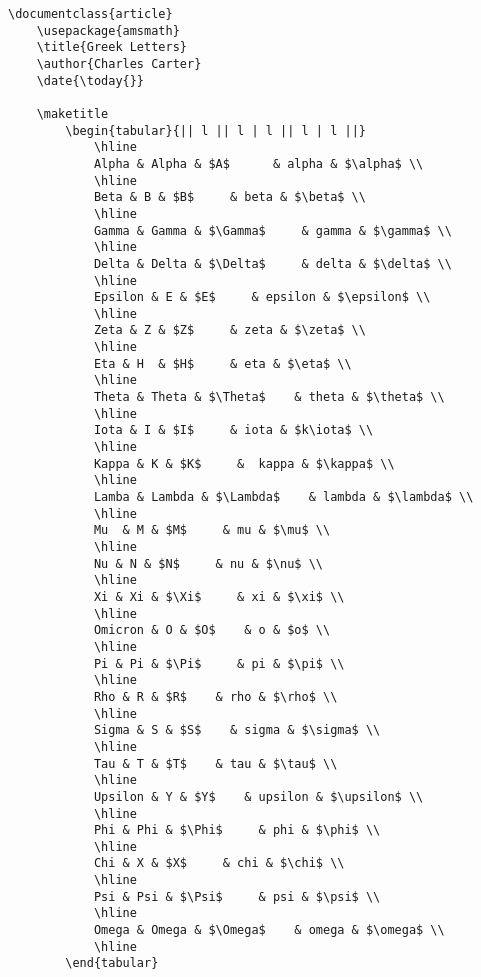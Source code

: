         \begin{verbatim}
\documentclass{article}
    \usepackage{amsmath}
    \title{Greek Letters}
    \author{Charles Carter}
    \date{\today{}}
 
    \maketitle
        \begin{tabular}{|| l || l | l || l | l ||}
            \hline
            Alpha & Alpha & $A$      & alpha & $\alpha$ \\
            \hline
            Beta & B & $B$     & beta & $\beta$ \\
            \hline
            Gamma & Gamma & $\Gamma$     & gamma & $\gamma$ \\
            \hline
            Delta & Delta & $\Delta$     & delta & $\delta$ \\
            \hline
            Epsilon & E & $E$     & epsilon & $\epsilon$ \\
            \hline
            Zeta & Z & $Z$     & zeta & $\zeta$ \\
            \hline
            Eta & H  & $H$     & eta & $\eta$ \\
            \hline
            Theta & Theta & $\Theta$    & theta & $\theta$ \\
            \hline
            Iota & I & $I$     & iota & $k\iota$ \\
            \hline
            Kappa & K & $K$     &  kappa & $\kappa$ \\
            \hline
            Lamba & Lambda & $\Lambda$    & lambda & $\lambda$ \\
            \hline
            Mu  & M & $M$     & mu & $\mu$ \\
            \hline
            Nu & N & $N$     & nu & $\nu$ \\
            \hline
            Xi & Xi & $\Xi$     & xi & $\xi$ \\
            \hline
            Omicron & O & $O$    & o & $o$ \\
            \hline
            Pi & Pi & $\Pi$     & pi & $\pi$ \\
            \hline
            Rho & R & $R$    & rho & $\rho$ \\
            \hline
            Sigma & S & $S$    & sigma & $\sigma$ \\
            \hline
            Tau & T & $T$    & tau & $\tau$ \\
            \hline
            Upsilon & Y & $Y$    & upsilon & $\upsilon$ \\
            \hline
            Phi & Phi & $\Phi$     & phi & $\phi$ \\
            \hline
            Chi & X & $X$     & chi & $\chi$ \\
            \hline
            Psi & Psi & $\Psi$     & psi & $\psi$ \\
            \hline
            Omega & Omega & $\Omega$    & omega & $\omega$ \\
            \hline
        \end{tabular}
    

\end{verbatim}

